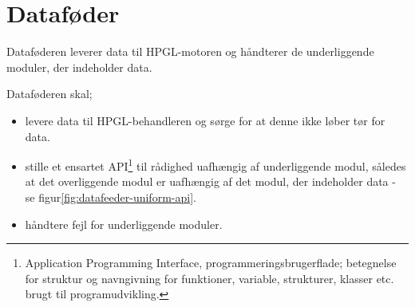 \section[Dataføder (med SPI og SD-/MMC-kort)]{Dataføder}


Dataføderen leverer data til HPGL-motoren og håndterer de
underliggende moduler, der indeholder data.

Dataføderen skal;
\begin{itemize} \firmlist
\item levere data til HPGL-behandleren og sørge for at denne ikke løber
  tør for data.
\item stille et ensartet API\footnote{Application Programming
    Interface, programmeringsbrugerflade; betegnelse for struktur og
    navngivning for funktioner, variable, strukturer, klasser
    etc. brugt til programudvikling.} til rådighed uafhængig af
  underliggende modul, således at det overliggende modul er uafhængig
  af det modul, der indeholder data - se
  figur\vref{fig:datafeeder-uniform-api}.
\item håndtere fejl for underliggende moduler.
\end{itemize}


